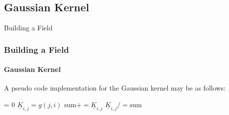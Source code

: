 \documentclass[professionalfont,10pt]{beamer}
\begin{document}
	\subsection{Gaussian Kernel}
	\begin{frame}[t]{Building a Field}
		\frametitle{Building a Field}
		\framesubtitle{Gaussian Kernel}
		\hskip-0.75cm
		\begin{minipage}[t]{0.2\linewidth}\vspace{-0.5cm}
			\tiny\tableofcontents[currentsection,currentsubsection,hideothersubsections,subsectionstyle=show/shaded]
		\end{minipage}
		\hfill%
		\begin{minipage}[t]{0.86\linewidth}\vspace{-0.5cm}
			\begin{flushleft}
				A pseudo code implementation for the Gaussian kernel may be as follows:
				\begin{algorithm}[H]
					\begin{algorithmic}[1]
						\STATE {} = 0
						\STATE $\underline{K}_{i, j} = g(j, i)$
						\STATE $\text{sum} += \underline{K}_{i, j}$
						\ENDFOR
						\ENDFOR
						\STATE $\underline{K}_{i, j} /= \text{sum}$
					\end{algorithmic}
					\label{alg:seq}
				\end{algorithm}
			\end{flushleft}
		\end{minipage}
		\vfill%
	\end{frame}
	
\end{document}
